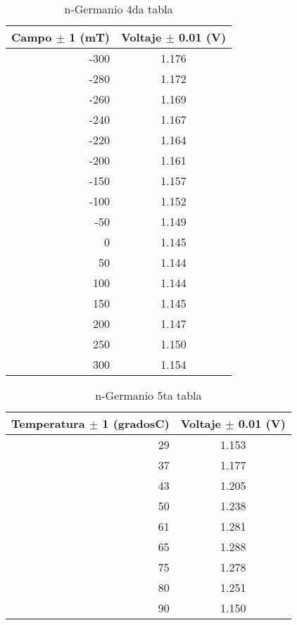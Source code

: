 \documentclass[aps,prl,reprint]{revtex4-1}
\begin{document}
\begin{table}[H]
\begin{center}
\begin{tabular}
{|| r || c ||} 
\hline\hline
Campo $\pm$ 1 (mT) & Voltaje $\pm$ 0.01 (V) \\   

\hline

-300 & 1.176 \\
-280 & 1.172 \\
-260 & 1.169 \\
-240 & 1.167 \\
-220 & 1.164 \\
-200 & 1.161 \\
-150 & 1.157 \\
-100 & 1.152 \\
-50 & 1.149 \\
0 & 1.145 \\
50 & 1.144\\
100 & 1.144 \\
150 & 1.145\\
200 & 1.147 \\
250 & 1.150\\
300 & 1.154 \\


\hline\hline
\end{tabular}
\end{center}
\caption{n-Germanio 4da tabla}
\label{4n}
\end{table}


\begin{table}[H]
\begin{center}
\begin{tabular}
{|| r || c ||} 
\hline\hline
Temperatura $\pm$ 1 (gradosC) & Voltaje $\pm$ 0.01 (V)\\

\hline

29 & 1.153 \\
37 & 1.177 \\
43 & 1.205 \\
50 & 1.238 \\
61 & 1.281 \\
65 & 1.288 \\
75 & 1.278 \\
80 & 1.251 \\
90 & 1.150 \\


\hline\hline
\end{tabular}
\end{center}
\caption{n-Germanio 5ta tabla}
\label{5n}
\end{table}
\end{document}
